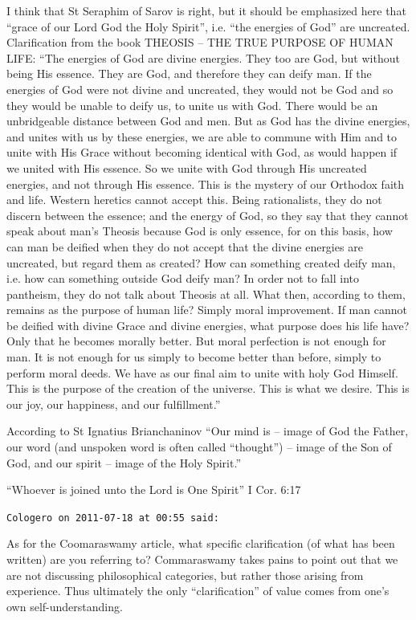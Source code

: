 \begin{footnotesize}
\begin{sffamily}
I think that St Seraphim of Sarov is right, but it should be emphasized here that “grace of our Lord God the Holy Spirit”, i.e. “the energies of God” are uncreated. Clarification from the book THEOSIS – THE TRUE PURPOSE OF HUMAN LIFE: “The energies of God are divine energies. They too are God, but without being His essence. They are God, and therefore they can deify man. If the energies of God were not divine and uncreated, they would not be God and so they would be unable to deify us, to unite us with God. There would be an unbridgeable distance between God and men. But as God has the divine energies, and unites with us by these energies, we are able to commune with Him and to unite with His Grace without becoming identical with God, as would happen if we united with His essence. So we unite with God through His uncreated energies, and not through His essence. This is the mystery of our Orthodox faith and life. Western heretics cannot accept this. Being rationalists, they do not discern between the essence; and the energy of God, so they say that they cannot speak about man's Theosis because God is only essence, for on this basis, how can man be deified when they do not accept that the divine energies are uncreated, but regard them as created? How can something created deify man, i.e. how can something outside God deify man? In order not to fall into pantheism, they do not talk about Theosis at all. What then, according to them, remains as the purpose of human life? Simply moral improvement. If man cannot be deified with divine Grace and divine energies, what purpose does his life have? Only that he becomes morally better. But moral perfection is not enough for man. It is not enough for us simply to become better than before, simply to perform moral deeds. We have as our final aim to unite with holy God Himself. This is the purpose of the creation of the universe. This is what we desire. This is our joy, our happiness, and our fulfillment.''

According to St Ignatius Brianchaninov “Our mind is – image of God the Father, our word (and unspoken word is often called “thought”) – image of the Son of God, and our spirit – image of the Holy Spirit.” 

“Whoever is joined unto the Lord is One Spirit” I Cor. 6:17

\hfill

\texttt{Cologero on 2011-07-18 at 00:55 said: }

As for the Coomaraswamy article, what specific clarification (of what has been written) are you referring to? Commaraswamy takes pains to point out that we are not discussing philosophical categories, but rather those arising from experience. Thus ultimately the only “clarification” of value comes from one's own self-understanding.


\end{sffamily}
\end{footnotesize}
